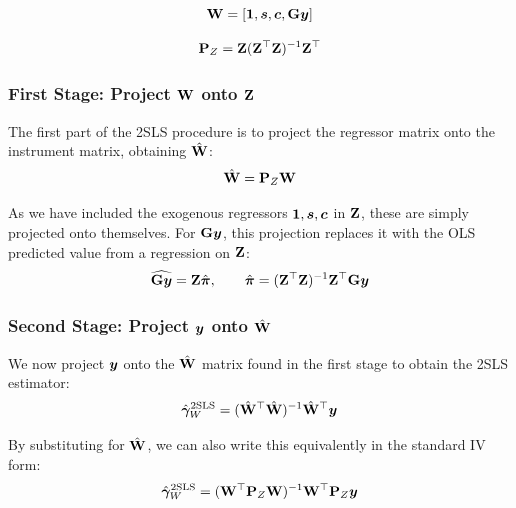 \begin{equation}
    \mathbf{W} = [\bm{1}, \bm{s}, \bm{c}, \mathbf{G}\bm{y}]
\end{equation}

\begin{equation}
    \mathbf{P}_Z = \mathbf{Z}(\mathbf{Z}^\top\mathbf{Z})^{-1}\mathbf{Z}^\top
\end{equation}

\subsubsection{First Stage: Project $\mathbf{W}$ onto $\mathbf{Z}$}
The first part of the 2SLS procedure is to project the regressor matrix onto the instrument matrix, obtaining $\hat{\mathbf{W}}$:
\begin{equation}
    \hat{\mathbf{W}} = \mathbf{P}_Z\mathbf{W}
\end{equation}

As we have included the exogenous regressors $\bm{1}, \bm{s}, \bm{c}$ in $\mathbf{Z}$, these are simply projected onto themselves. For $\mathbf{G}\bm{y}$, this projection replaces it with the OLS predicted value from a regression on $\mathbf{Z}$:
\begin{equation}
    \widehat{\mathbf{G}\bm{y}} = \mathbf{Z}\hat{\bm{\pi}}, \qquad \hat{\bm{\pi}} = (\mathbf{Z}^\top\mathbf{Z})^{-1}\mathbf{Z}^\top\mathbf{G}\bm{y}
\end{equation}


\subsubsection{Second Stage: Project $\bm{y}$ onto $\hat{\mathbf{W}}$}

We now project $\bm{y}$ onto the $\hat{\mathbf{W}}$ matrix found in the first stage to obtain the 2SLS estimator:
\begin{equation}
    \hat{\bm{\gamma}}_W^{\text{2SLS}} = (\hat{\mathbf{W}}^\top\hat{\mathbf{W}})^{-1}
    \hat{\mathbf{W}}^\top\bm{y}
\end{equation}

By substituting for $\hat{\mathbf{W}}$, we can also write this equivalently in the standard IV form:
\begin{equation}
    \hat{\bm{\gamma}}_W^{\text{2SLS}} = (\mathbf{W}^\top\mathbf{P}_Z\mathbf{W})^{-1}
    \mathbf{W}^\top\mathbf{P}_Z\bm{y}
\end{equation}

